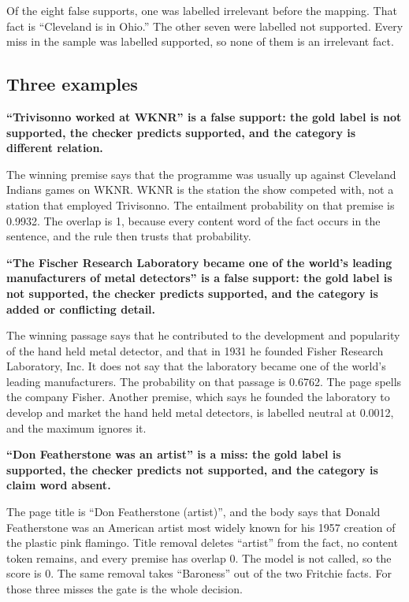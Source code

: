 Of the eight false supports, one was labelled irrelevant before the mapping. That fact is ``Cleveland is in Ohio.'' The other seven were labelled not supported. Every miss in the sample was labelled supported, so none of them is an irrelevant fact.

\subsection{Three examples}

\textbf{``Trivisonno worked at WKNR'' is a false support: the gold label is not supported, the checker predicts supported, and the category is different relation.}

The winning premise says that the programme was usually up against Cleveland Indians games on WKNR. WKNR is the station the show competed with, not a station that employed Trivisonno. The entailment probability on that premise is 0.9932. The overlap is 1, because every content word of the fact occurs in the sentence, and the rule then trusts that probability.

\textbf{``The Fischer Research Laboratory became one of the world's leading manufacturers of metal detectors'' is a false support: the gold label is not supported, the checker predicts supported, and the category is added or conflicting detail.}

The winning passage says that he contributed to the development and popularity of the hand held metal detector, and that in 1931 he founded Fisher Research Laboratory, Inc. It does not say that the laboratory became one of the world's leading manufacturers. The probability on that passage is 0.6762. The page spells the company Fisher. Another premise, which says he founded the laboratory to develop and market the hand held metal detectors, is labelled neutral at 0.0012, and the maximum ignores it.

\textbf{``Don Featherstone was an artist'' is a miss: the gold label is supported, the checker predicts not supported, and the category is claim word absent.}

The page title is ``Don Featherstone (artist)'', and the body says that Donald Featherstone was an American artist most widely known for his 1957 creation of the plastic pink flamingo. Title removal deletes ``artist'' from the fact, no content token remains, and every premise has overlap 0. The model is not called, so the score is 0. The same removal takes ``Baroness'' out of the two Fritchie facts. For those three misses the gate is the whole decision.

